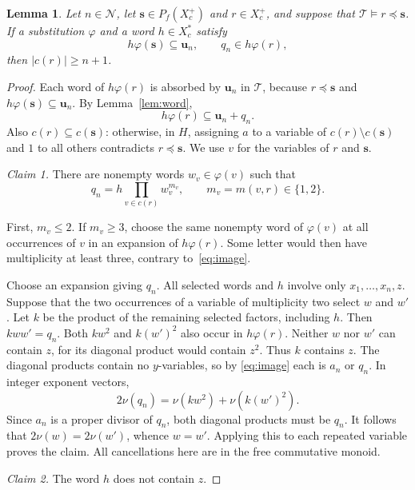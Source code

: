 \documentclass[10pt,a4paper]{amsart}
\newtheorem{lemma}[theorem]{Lemma}
\newcommand{\T}{\mathcal T}
\newcommand{\Ncal}{\mathcal N}
\newcommand{\bu}{\mathbf u}
\newcommand{\bs}{\mathbf s}
\numberwithin{equation}{section}
\begin{document}
\begin{lemma}\label{lem:substitution}
Let $n\in\Ncal$, let $\bs\in P_f(X_c^+)$ and $r\in X_c^+$, and
suppose that $\T\models r\preceq\bs$. If a substitution $\varphi$ and
a word $h\in X_c^*$ satisfy
\begin{equation}\label{eq:hyp}
h\varphi(\bs)\subseteq\bu_n,\qquad q_n\in h\varphi(r),
\end{equation}
then $|c(r)|\geq n+1$.
\end{lemma}
\begin{proof}
Each word of $h\varphi(r)$ is absorbed by $\bu_n$ in $\T$, because
$r\preceq\bs$ and $h\varphi(\bs)\subseteq\bu_n$. By
Lemma~\ref{lem:word},
\begin{equation}\label{eq:image}
h\varphi(r)\subseteq\bu_n+q_n.
\end{equation}
Also $c(r)\subseteq c(\bs)$: otherwise, in $H$, assigning $a$ to a
variable of $c(r)\setminus c(\bs)$ and $1$ to all others contradicts
$r\preceq\bs$. We use $v$ for the variables of $r$ and $\bs$.

\emph{Claim 1.} There are nonempty words $w_v\in\varphi(v)$ such that
\begin{equation}\label{eq:factor}
q_n=h\prod_{v\in c(r)}w_v^{m_v},\qquad
m_v=m(v,r)\in\{1,2\}.
\end{equation}

First, $m_v\leq2$. If $m_v\geq3$, choose the same nonempty word of
$\varphi(v)$ at all occurrences of $v$ in an expansion of
$h\varphi(r)$. Some letter would then have multiplicity at least three,
contrary to~\eqref{eq:image}.

Choose an expansion giving $q_n$. All selected words and $h$ involve
only $x_1,\ldots,x_n,z$. Suppose that the two occurrences of a variable
of multiplicity two select $w$ and $w'$. Let $k$ be the product of the
remaining selected factors, including $h$. Then $kww'=q_n$. Both
$kw^2$ and $k(w')^2$ also occur in $h\varphi(r)$. Neither $w$ nor $w'$
can contain $z$, for its diagonal product would contain $z^2$. Thus $k$
contains $z$. The diagonal products contain no $y$-variables, so by
\eqref{eq:image} each is $a_n$ or $q_n$. In integer exponent vectors,
\[
2\nu(q_n)=\nu(kw^2)+\nu(k(w')^2).
\]
Since $a_n$ is a proper divisor of $q_n$, both diagonal products must
be $q_n$. It follows that $2\nu(w)=2\nu(w')$, whence $w=w'$.
Applying this to each repeated variable proves the claim. All cancellations
here are in the free commutative monoid.

\emph{Claim 2.} The word $h$ does not contain $z$.


\end{proof}
\end{document}
